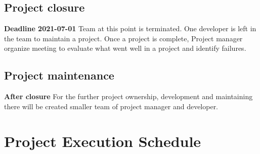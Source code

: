 \documentclass{VUMIFPSkursinis}
\begin{document}
	\subsection{Project closure}
	\textbf{Deadline 2021-07-01}
	Team at this point is terminated. One developer is left in the team to maintain a project. Once a project is complete, Project manager organize meeting to evaluate what went well in a project and identify failures.
	\subsection{Project maintenance}
	\textbf{After closure}
	For the further project ownership, development and maintaining there will be created smaller team of project manager and developer.

\section{Project Execution Schedule}
\end{document}
